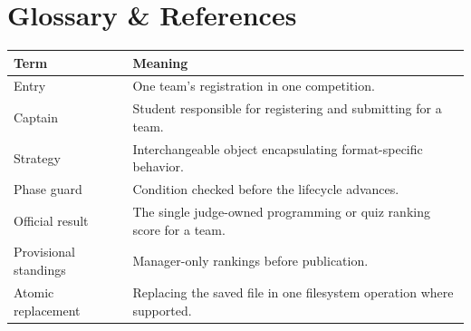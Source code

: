\documentclass[12pt]{article}
\begin{document}
\clearpage\section{Glossary \& References}
\begin{tabularx}{\linewidth}{lY}\toprule Term & Meaning\\\midrule
Entry & One team's registration in one competition.\\
Captain & Student responsible for registering and submitting for a team.\\
Strategy & Interchangeable object encapsulating format-specific behavior.\\
Phase guard & Condition checked before the lifecycle advances.\\
Official result & The single judge-owned programming or quiz ranking score for a team.\\
Provisional standings & Manager-only rankings before publication.\\
Atomic replacement & Replacing the saved file in one filesystem operation where supported.\\\bottomrule\end{tabularx}

\end{document}
